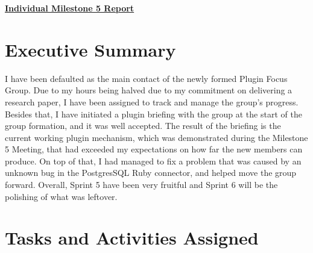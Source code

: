 \documentclass{article}
\begin{document}
\pagestyle{headings}

\begin{center}
{\LARGE\textbf{\underline{{Individual Milestone 5 Report}}}}
\end{center}

\section*{Executive Summary}

I have been defaulted as the main contact of the newly formed Plugin Focus Group. Due to my hours being halved due to my commitment on delivering a research paper, I have been assigned to track and manage the group's progress. Besides that, I have initiated a plugin briefing with the group at the start of the group formation, and it was well accepted. The result of the briefing is the current working plugin mechanism, which was demonstrated during the Milestone 5 Meeting, that had exceeded my expectations on how far the new members can produce. On top of that, I had managed to fix a problem that was caused by an unknown bug in the PostgresSQL Ruby connector, and helped move the group forward. Overall, Sprint 5 have been very fruitful and Sprint 6 will be the polishing of what was leftover. 

\section*{Tasks and Activities Assigned}
\end{document}
